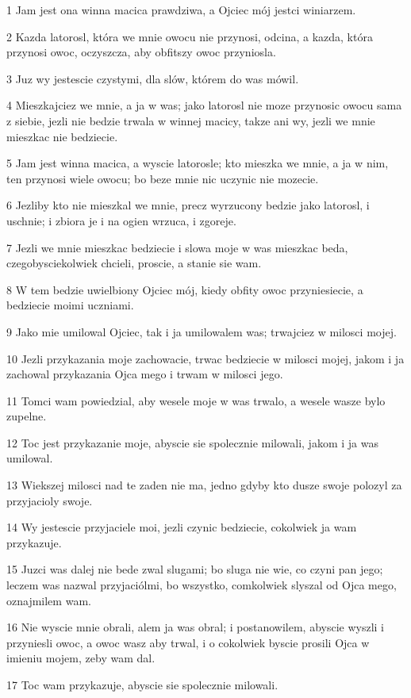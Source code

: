 \par 1 Jam jest ona winna macica prawdziwa, a Ojciec mój jestci winiarzem.
\par 2 Kazda latorosl, która we mnie owocu nie przynosi, odcina, a kazda, która przynosi owoc, oczyszcza, aby obfitszy owoc przyniosla.
\par 3 Juz wy jestescie czystymi, dla slów, którem do was mówil.
\par 4 Mieszkajciez we mnie, a ja w was; jako latorosl nie moze przynosic owocu sama z siebie, jezli nie bedzie trwala w winnej macicy, takze ani wy, jezli we mnie mieszkac nie bedziecie.
\par 5 Jam jest winna macica, a wyscie latorosle; kto mieszka we mnie, a ja w nim, ten przynosi wiele owocu; bo beze mnie nic uczynic nie mozecie.
\par 6 Jezliby kto nie mieszkal we mnie, precz wyrzucony bedzie jako latorosl, i uschnie; i zbiora je i na ogien wrzuca, i zgoreje.
\par 7 Jezli we mnie mieszkac bedziecie i slowa moje w was mieszkac beda, czegobysciekolwiek chcieli, proscie, a stanie sie wam.
\par 8 W tem bedzie uwielbiony Ojciec mój, kiedy obfity owoc przyniesiecie, a bedziecie moimi uczniami.
\par 9 Jako mie umilowal Ojciec, tak i ja umilowalem was; trwajciez w milosci mojej.
\par 10 Jezli przykazania moje zachowacie, trwac bedziecie w milosci mojej, jakom i ja zachowal przykazania Ojca mego i trwam w milosci jego.
\par 11 Tomci wam powiedzial, aby wesele moje w was trwalo, a wesele wasze bylo zupelne.
\par 12 Toc jest przykazanie moje, abyscie sie spolecznie milowali, jakom i ja was umilowal.
\par 13 Wiekszej milosci nad te zaden nie ma, jedno gdyby kto dusze swoje polozyl za przyjacioly swoje.
\par 14 Wy jestescie przyjaciele moi, jezli czynic bedziecie, cokolwiek ja wam przykazuje.
\par 15 Juzci was dalej nie bede zwal slugami; bo sluga nie wie, co czyni pan jego; leczem was nazwal przyjaciólmi, bo wszystko, comkolwiek slyszal od Ojca mego, oznajmilem wam.
\par 16 Nie wyscie mnie obrali, alem ja was obral; i postanowilem, abyscie wyszli i przyniesli owoc, a owoc wasz aby trwal, i o cokolwiek byscie prosili Ojca w imieniu mojem, zeby wam dal.
\par 17 Toc wam przykazuje, abyscie sie spolecznie milowali.
